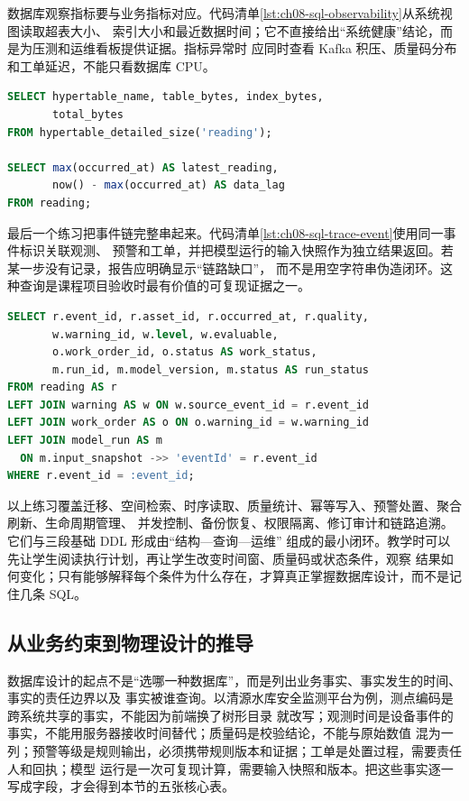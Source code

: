 数据库观察指标要与业务指标对应。代码清单\ref{lst:ch08-sql-observability}从系统视图读取超表大小、
索引大小和最近数据时间；它不直接给出“系统健康”结论，而是为压测和运维看板提供证据。指标异常时
应同时查看 Kafka 积压、质量码分布和工单延迟，不能只看数据库 CPU。

\begin{lstlisting}[label={lst:ch08-sql-observability},language=SQL,caption={数据库容量与新鲜度观察}]
SELECT hypertable_name, table_bytes, index_bytes,
       total_bytes
FROM hypertable_detailed_size('reading');

SELECT max(occurred_at) AS latest_reading,
       now() - max(occurred_at) AS data_lag
FROM reading;
\end{lstlisting}

最后一个练习把事件链完整串起来。代码清单\ref{lst:ch08-sql-trace-event}使用同一事件标识关联观测、
预警和工单，并把模型运行的输入快照作为独立结果返回。若某一步没有记录，报告应明确显示“链路缺口”，
而不是用空字符串伪造闭环。这种查询是课程项目验收时最有价值的可复现证据之一。

\begin{lstlisting}[label={lst:ch08-sql-trace-event},language=SQL,caption={按事件标识追溯业务闭环}]
SELECT r.event_id, r.asset_id, r.occurred_at, r.quality,
       w.warning_id, w.level, w.evaluable,
       o.work_order_id, o.status AS work_status,
       m.run_id, m.model_version, m.status AS run_status
FROM reading AS r
LEFT JOIN warning AS w ON w.source_event_id = r.event_id
LEFT JOIN work_order AS o ON o.warning_id = w.warning_id
LEFT JOIN model_run AS m
  ON m.input_snapshot ->> 'eventId' = r.event_id
WHERE r.event_id = :event_id;
\end{lstlisting}

以上练习覆盖迁移、空间检索、时序读取、质量统计、幂等写入、预警处置、聚合刷新、生命周期管理、
并发控制、备份恢复、权限隔离、修订审计和链路追溯。它们与三段基础 DDL 形成由“结构—查询—运维”
组成的最小闭环。教学时可以先让学生阅读执行计划，再让学生改变时间窗、质量码或状态条件，观察
结果如何变化；只有能够解释每个条件为什么存在，才算真正掌握数据库设计，而不是记住几条 SQL。

\subsection{从业务约束到物理设计的推导}

数据库设计的起点不是“选哪一种数据库”，而是列出业务事实、事实发生的时间、事实的责任边界以及
事实被谁查询。以清源水库安全监测平台为例，测点编码是跨系统共享的事实，不能因为前端换了树形目录
就改写；观测时间是设备事件的事实，不能用服务器接收时间替代；质量码是校验结论，不能与原始数值
混为一列；预警等级是规则输出，必须携带规则版本和证据；工单是处置过程，需要责任人和回执；模型
运行是一次可复现计算，需要输入快照和版本。把这些事实逐一写成字段，才会得到本节的五张核心表。


